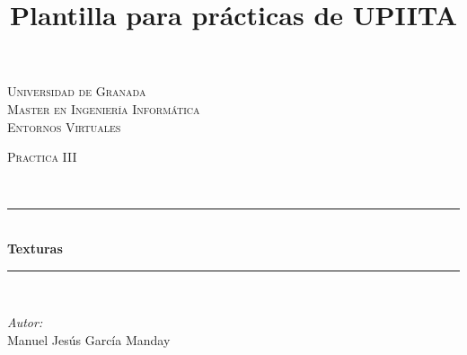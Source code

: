 \documentclass[10pt]{article}
\title{Plantilla para prácticas de UPIITA}
\begin{document}
\begin{center}																		%
\newcommand{\HRule}{\rule{\linewidth}{0.5mm}}									%
\begin{minipage}{0.48\textwidth} \begin{flushleft}
\end{flushleft}\end{minipage}
\begin{minipage}{0.48\textwidth} \begin{flushright}
\end{flushright}\end{minipage}

\vspace*{0.25cm}								%
\textsc{\huge Universidad de Granada}\\[1.5cm]	

\textsc{\LARGE Master en Ingeniería Informática}\\[1.5cm]													%

\textsc{\LARGE Entornos Virtuales}\\[1.5cm]													%

\begin{minipage}{0.9\textwidth} 
\begin{center}																					%
\textsc{\LARGE Practica III}
\end{center}
\end{minipage}\\[0.5cm]
 			\vspace*{1cm}																		%
\HRule \\[0.4cm]																	%
{ \huge \bfseries Texturas}\\[0.4cm]	%
\HRule \\[1.5cm]																	%
\begin{minipage}{0.46\textwidth}													%
\begin{flushleft} \large															%
\emph{Autor:}\\	
 Manuel Jesús García Manday
\end{flushleft}																		%
\end{minipage}		
\begin{minipage}{0.52\textwidth}		
\vspace{-0.6cm}											%
\begin{flushright} \large															%
\end{flushright}																	%
\end{minipage}	
\vspace*{1cm}
 	

\end{center}
\end{document}
